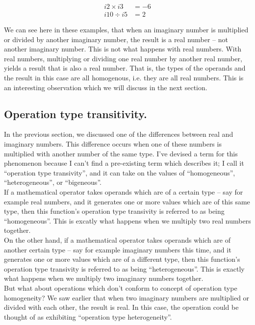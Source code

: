 \documentclass{article}
\begin{document}
\begin{align*}
i2 \times i3 &= -6 \\
i10 \div i5 &= 2 
\end{align*}

We can see here in these examples, that when an imaginary number is multiplied or divided by another imaginary
number, the result is a real number -- not another imaginary number. This is not what happens with real numbers.
With real numbers, multiplying or dividing one real number by another real number, yields a result that is
also a real number. That is, the types of the operands and the result in this case are all homogenous, i.e. 
they are all real numbers. This is an interesting observation which we will discuss in the next section. 

\subsection{Operation type transitivity.}

In the previous section, we discussed one of the differences between real and imaginary numbers. This difference
occurs when one of these numbers is multiplied with another number of the same type. I've devised a term for this
phenomenon because I can't find a pre-existing term which describes it; I call it ``operation type transivity'', and
it can take on the values of ``homogeneous'', ``heterogeneous'', or ``bigeneous''.\\

If a mathematical operator takes operands which are of a certain type -- say for example real numbers, and it
generates one or more values which are of this same type, then this function's operation type transivity is
referred to as being ``homogeneous''. This is excatly what happens when we multiply two real numbers together.\\

On the other hand, if a mathematical operator takes operands which are of another certain type -- say for example 
imaginary numbers this time, and it generates one or more values which are of a different type, then this function's 
operation type transivity is referred to as being ``heterogeneous''. This is exactly what happens when we multiply two
imaginary numbers together.\\

But what about operations which don't conform to concept of operation type homogeneity? We saw earlier that when 
two imaginary numbers are multiplied or divided with each other, the result is real. In this case, the operation
could be thought of as exhibiting ``operation type heterogeneity''.
\end{document}
